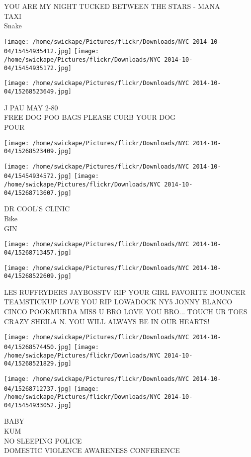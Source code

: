 \documentclass[10pt,letterpaper]{article}
\begin{document}
YOU ARE MY NIGHT TUCKED BETWEEN THE STARS {-} MANA\\
TAXI\\
Snake
\pagebreak

\texttt{[image: /home/swickape/Pictures/flickr/Downloads/NYC 2014-10-04/15454935412.jpg]}
\texttt{[image: /home/swickape/Pictures/flickr/Downloads/NYC 2014-10-04/15454935172.jpg]}

\texttt{[image: /home/swickape/Pictures/flickr/Downloads/NYC 2014-10-04/15268523649.jpg]}

J PAU MAY 2{-}80\\
FREE DOG POO BAGS PLEASE CURB YOUR DOG\\
POUR
\pagebreak

\texttt{[image: /home/swickape/Pictures/flickr/Downloads/NYC 2014-10-04/15268523409.jpg]}

\vspace{0.25in}
\texttt{[image: /home/swickape/Pictures/flickr/Downloads/NYC 2014-10-04/15454934572.jpg]}
\texttt{[image: /home/swickape/Pictures/flickr/Downloads/NYC 2014-10-04/15268713607.jpg]}

DR COOL'S CLINIC\\
Bike\\
GIN
\pagebreak

\texttt{[image: /home/swickape/Pictures/flickr/Downloads/NYC 2014-10-04/15268713457.jpg]}

\vspace{0.25in}
\texttt{[image: /home/swickape/Pictures/flickr/Downloads/NYC 2014-10-04/15268522609.jpg]}

LES RUFFRYDERS JAYBOSSTV RIP YOUR GIRL FAVORITE BOUNCER TEAMSTICKUP LOVE YOU RIP LOWADOCK NY5 JONNY BLANCO CINCO POOKMURDA MISS U BRO LOVE YOU BRO... TOUCH UR TOES\\
CRAZY SHEILA N. YOU WILL ALWAYS BE IN OUR HEARTS!
\pagebreak

\texttt{[image: /home/swickape/Pictures/flickr/Downloads/NYC 2014-10-04/15268574450.jpg]}
\texttt{[image: /home/swickape/Pictures/flickr/Downloads/NYC 2014-10-04/15268521829.jpg]}

\texttt{[image: /home/swickape/Pictures/flickr/Downloads/NYC 2014-10-04/15268712737.jpg]}
\texttt{[image: /home/swickape/Pictures/flickr/Downloads/NYC 2014-10-04/15454933052.jpg]}

BABY\\
KUM\\
NO SLEEPING POLICE\\
DOMESTIC VIOLENCE AWARENESS CONFERENCE
\pagebreak
\end{document}
